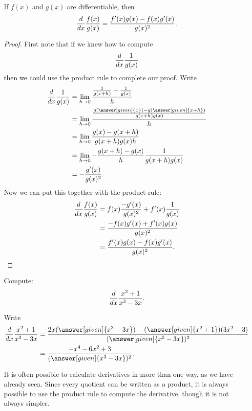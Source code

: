 \documentclass{ximera}
\begin{document}
\begin{theorem}\label{theorem:quotient-rule}
If $f(x)$ and $g(x)$ are differentiable, then
\[
\frac{d}{dx} \frac{f(x)}{g(x)} = \frac{f'(x)g(x)-f(x)g'(x)}{g(x)^2}.
\]
\end{theorem}
\begin{proof}
First note that if we knew how to compute
\[
\frac{d}{dx} \frac{1}{g(x)}
\]
then we could use the product rule to complete our proof.  Write
\begin{align*}
\ddx\frac{1}{g(x)}&=\lim_{h\to0} \frac{\frac{1}{g(x+h)}-\frac{1}{g(x)}}{h} \\
&=\lim_{h\to0} \frac{\frac{g(\answer[given]{x})-g(\answer[given]{x+h})}{g(x+h)g(x)}}{h} \\
&=\lim_{h\to0} \frac{g(x)-g(x+h)}{g(x+h)g(x)h} \\
&=\lim_{h\to0} -\frac{g(x+h)-g(x)}{h} \frac{1}{g(x+h)g(x)} \\
&=-\frac{g'(x)}{g(x)^2}.
\end{align*}
Now we can put this together with the product rule:
\begin{align*}
\frac{d}{dx}\frac{f(x)}{g(x)} &=f(x)\frac{-g'(x)}{g(x)^2}+f'(x)\frac{1}{g(x)}\\
&=\frac{-f(x)g'(x)+f'(x)g(x)}{g(x)^2}\\
&=\frac{f'(x)g(x)-f(x)g'(x)}{g(x)^2}.
\end{align*}

\end{proof}


\begin{example}
Compute:
\[
\frac{d}{dx} \frac{x^2+1}{x^3-3x}.
\]

\begin{explanation}
Write
\begin{align*}
\ddx \frac{x^2+1}{x^3-3x} &= \frac{2x(\answer[given]{x^3-3x})-(\answer[given]{x^2+1})(3x^2-3)}{(\answer[given]{x^3-3x})^2}\\
&=\frac{-x^4-6x^2+3}{(\answer[given]{x^3-3x})^2}.
\end{align*}
\end{explanation}
\end{example}

It is often possible to calculate derivatives in more than one way, as
we have already seen. Since every quotient can be written as a
product, it is always possible to use the product rule to compute the
derivative, though it is not always simpler.
\end{document}
